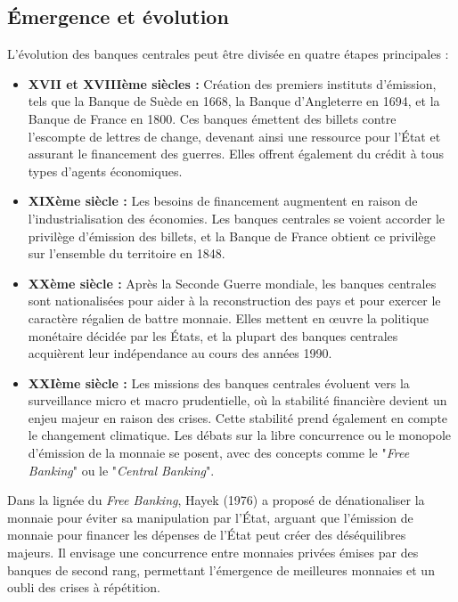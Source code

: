 \documentclass[a4paper, 12pt]{report}
\begin{document}
\subsection{Émergence et évolution}

L'évolution des banques centrales peut être divisée en quatre étapes principales :

\begin{itemize}
	\item \textbf{XVII et XVIIIème siècles :} Création des premiers instituts d'émission, tels que la Banque de Suède en 1668, la Banque d'Angleterre en 1694, et la Banque de France en 1800. Ces banques émettent des billets contre l'escompte de lettres de change, devenant ainsi une ressource pour l'État et assurant le financement des guerres. Elles offrent également du crédit à tous types d'agents économiques.
	
	\item \textbf{XIXème siècle :} Les besoins de financement augmentent en raison de l'industrialisation des économies. Les banques centrales se voient accorder le privilège d'émission des billets, et la Banque de France obtient ce privilège sur l'ensemble du territoire en 1848.
	
	\item \textbf{XXème siècle :} Après la Seconde Guerre mondiale, les banques centrales sont nationalisées pour aider à la reconstruction des pays et pour exercer le caractère régalien de battre monnaie. Elles mettent en œuvre la politique monétaire décidée par les États, et la plupart des banques centrales acquièrent leur indépendance au cours des années 1990.
	
	\item \textbf{XXIème siècle :} Les missions des banques centrales évoluent vers la surveillance micro et macro prudentielle, où la stabilité financière devient un enjeu majeur en raison des crises. Cette stabilité prend également en compte le changement climatique. Les débats sur la libre concurrence ou le monopole d'émission de la monnaie se posent, avec des concepts comme le "\textit{Free Banking}" ou le "\textit{Central Banking}".
\end{itemize}

Dans la lignée du \textit{Free Banking}, Hayek (1976) a proposé de dénationaliser la monnaie pour éviter sa manipulation par l'État, arguant que l'émission de monnaie pour financer les dépenses de l'État peut créer des déséquilibres majeurs. Il envisage une concurrence entre monnaies privées émises par des banques de second rang, permettant l'émergence de meilleures monnaies et un oubli des crises à répétition.
\end{document}
